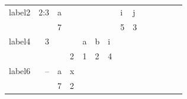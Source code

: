 \documentclass{beamer}
\begin{document}
\begin{frame}
{\begin{tabular}{|p{1cm}|r||R{0.5cm}||R{0.5cm}|R{0.5cm}|R{0.5cm}|R{0.5cm}|R{0.5cm}|R{0.5cm}|R{0.5cm}|R{0.5cm}|R{0.5cm}|R{0.5cm}|R{0.5cm}|}
			label2 & 2:3     & a &   &   &   &   & i & j &   &   &   &   & \\ 
			&         & 7 &   &   &   &   & 5 & 3 &   &   &   &   & \\ \hline
			label4 & 3       &   &   & a & b & i &   &   &   &   &   &   & \\ 
			&         &   & 2 & 1 & 2 & 4 &   &   &   &   &   &   & \\ \hline
			label6 & --      & a & x &   &   &   &   &   &   &   &   &   & \\ 
			&         & 7 & 2 &   &   &   &   &   &   &   &   &   & \\ \hline
	\end{tabular}}
\end{frame}




\end{document}
